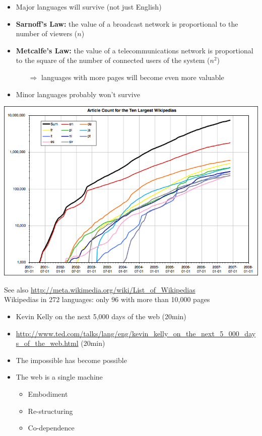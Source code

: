 \documentclass[a4paper,landscape,headrule,footrule,xetex]{foils}
\begin{document}
\MyLogo{}
\begin{itemize}
\item Major languages will survive (not just English)
\item \textbf{Sarnoff's Law:} the value of a broadcast network is
  proportional to the number of viewers ($n$)
\item \textbf{Metcalfe's Law:} the value of a telecommunications
    network is proportional to the square of the number of connected
    users of the system ($n^2$)
    \begin{itemize}
    \item[$\Rightarrow$] languages with more pages will become even more valuable
    \end{itemize}
\item Minor languages probably won't survive
\end{itemize}




\begin{center}
  \includegraphics[height=0.8\textheight]{../pics/TopTenWikipediasGraph}
\end{center}
 See also \url{http://meta.wikimedia.org/wiki/List_of_Wikipedias}
\\ Wikipedias in 272 languages: only 96 with more than 10,000 pages

\MyLogo{}
\begin{itemize}
\item Kevin Kelly on the next 5,000 days of the web (20min)
\item
  \url{http://www.ted.com/talks/lang/eng/kevin_kelly_on_the_next_5_000_days_of_the_web.html}
  (20min)
\item The impossible has become possible
\item The web is a single machine
  \begin{itemize}
  \item Embodiment
  \item Re-structuring
  \item Co-dependence
  \end{itemize}

\end{itemize}
\end{document}
